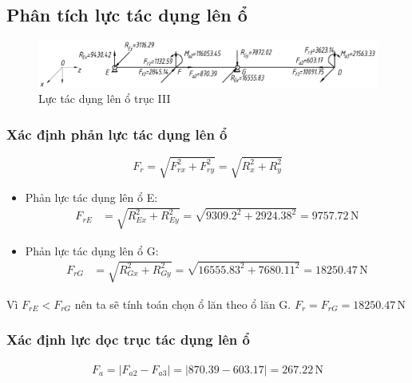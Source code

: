         \subsection{Phân tích lực tác dụng lên ổ}
            \begin{figure}[H]
                \centering
                \includegraphics[width=1\textwidth]{pictures/bearing_III.png}
                \caption{Lực tác dụng lên ổ trục III}
            \end{figure}
            \subsubsection{Xác định phản lực tác dụng lên ổ}
                \[
                    F_{r} = \sqrt{F_{rx}^2 + F_{ry}^2} = \sqrt{R_{x}^2 + R_{y}^2}
                \]
                \begin{itemize}
                    \item Phản lực tác dụng lên ổ E:
                        \begin{align*}
                            F_{rE} &= \sqrt{R_{Ex}^2 + R_{Ey}^2} = \sqrt{9309.2^2 + 2924.38^2} = 9757.72\, \mathrm{N}
                        \end{align*}
                    \item Phản lực tác dụng lên ổ G:
                        \begin{align*}
                            F_{rG} &= \sqrt{R_{Gx}^2 + R_{Gy}^2} = \sqrt{16555.83^2 + 7680.11^2} = 18250.47\, \mathrm{N}
                        \end{align*}
                \end{itemize}
                \hspace*{0.6cm}Vì $F_{rE} < F_{rG}$ nên ta sẽ tính toán chọn ổ lăn theo ổ lăn G. $F_{r} = F_{rG} = 18250.47\, \mathrm{N}$
            \subsubsection{Xác định lực dọc trục tác dụng lên ổ}
                \begin{align*}
                    F_{a} = |F_{a2} - F_{a3}| = |870.39 - 603.17| = 267.22\, \mathrm{N}
                \end{align*}
